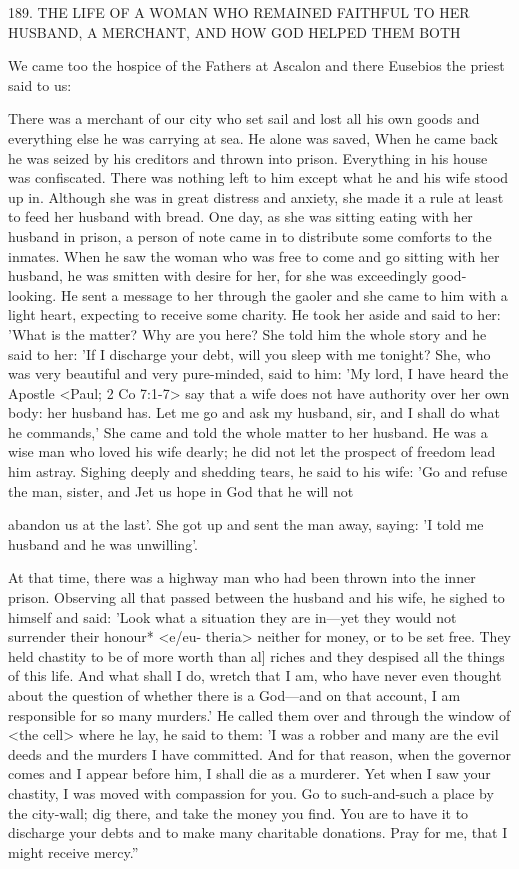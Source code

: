 189.
THE LIFE OF A WOMAN WHO REMAINED
FAITHFUL TO HER HUSBAND, A MERCHANT,
AND HOW GOD HELPED THEM BOTH

We came too the hospice of the Fathers at Ascalon and there
Eusebios the priest said to us:

There was a merchant of our city who set sail and lost all his own
goods and everything else he was carrying at sea.
He alone was
saved, When he came back he was seized by his creditors and
thrown into prison.
Everything in his house was confiscated.
There
was nothing left to him except what he and his wife stood up in.
Although she was in great distress and anxiety, she made it a rule
at least to feed her husband with bread.
One day, as she was sitting
eating with her husband in prison, a person of note came in to
distribute some comforts to the inmates.
When he saw the woman
who was free to come and go sitting with her husband, he was
smitten with desire for her, for she was exceedingly good-looking.
He sent a message to her through the gaoler and she came to him
with a light heart, expecting to receive some charity.
He took her
aside and said to her: 'What is the matter? Why are you here? She
told him the whole story and he said to her: 'If I discharge your
debt, will you sleep with me tonight? She, who was very beautiful
and very pure-minded, said to him: 'My lord, I have heard the
Apostle <Paul; 2 Co 7:1-7> say that a wife does not have authority
over her own body: her husband has.
Let me go and ask my
husband, sir, and I shall do what he commands,' She came and told
the whole matter to her husband.
He was a wise man who loved his
wife dearly; he did not let the prospect of freedom lead him astray.
Sighing deeply and shedding tears, he said to his wife: 'Go and
refuse the man, sister, and Jet us hope in God that he will not

abandon us at the last'.
She got up and sent the man away, saying:
'I told me husband and he was unwilling'.

At that time, there was a highway man who had been thrown
into the inner prison.
Observing all that passed between the husband
and his wife, he sighed to himself and said: 'Look what a situation
they are in—yet they would not surrender their honour* <e/eu-
theria> neither for money, or to be set free.
They held chastity to
be of more worth than al] riches and they despised all the things of
this life.
And what shall I do, wretch that I am, who have never
even thought about the question of whether there is a God—and on
that account, I am responsible for so many murders.' He called
them over and through the window of <the cell> where he lay, he
said to them: 'I was a robber and many are the evil deeds and the
murders I have committed.
And for that reason, when the governor
comes and I appear before him, I shall die as a murderer.
Yet when
I saw your chastity, I was moved with compassion for you.
Go to
such-and-such a place by the city-wall; dig there, and take the
money you find.
You are to have it to discharge your debts and to
make many charitable donations.
Pray for me, that I might receive
mercy.”

